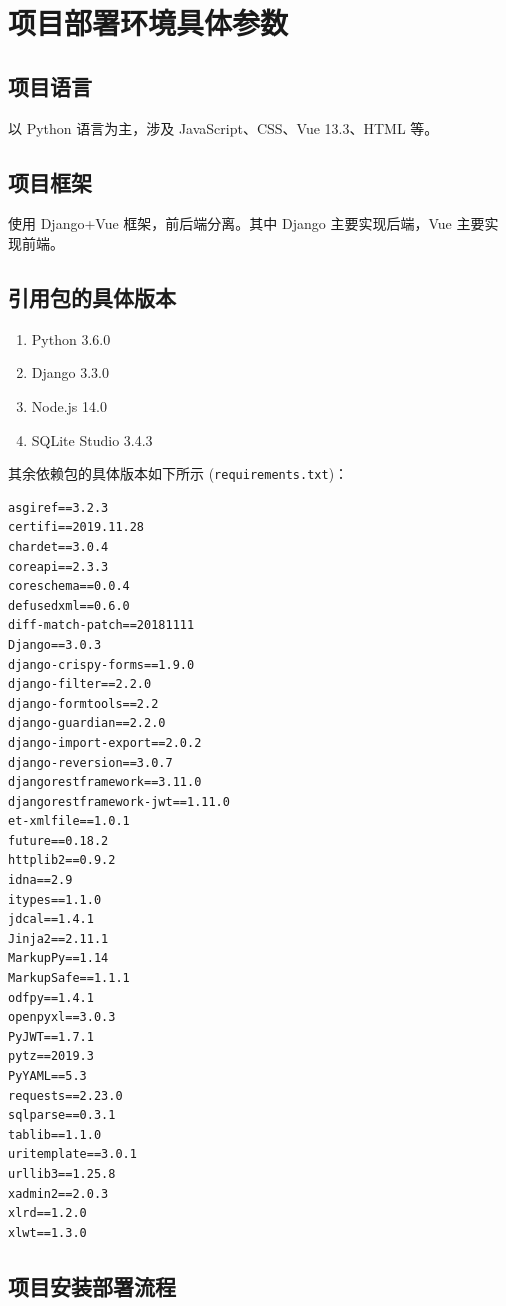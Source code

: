 \documentclass[UTF8,a4paper,10pt]{ctexart}
\begin{document}
\section{项目部署环境具体参数}

\subsection{项目语言}
以 Python 语言为主，涉及 JavaScript、CSS、Vue 13.3、HTML 等。

\subsection{项目框架}
使用 Django+Vue 框架，前后端分离。其中 Django 主要实现后端，Vue 主要实现前端。

\subsection{引用包的具体版本}
\begin{enumerate}
    \item Python 3.6.0
    \item Django 3.3.0
    \item Node.js 14.0
    \item SQLite Studio 3.4.3
\end{enumerate}

其余依赖包的具体版本如下所示 (\texttt{requirements.txt})：
\begin{framed}
\begin{verbatim}
asgiref==3.2.3
certifi==2019.11.28
chardet==3.0.4
coreapi==2.3.3
coreschema==0.0.4
defusedxml==0.6.0
diff-match-patch==20181111
Django==3.0.3
django-crispy-forms==1.9.0
django-filter==2.2.0
django-formtools==2.2
django-guardian==2.2.0
django-import-export==2.0.2
django-reversion==3.0.7
djangorestframework==3.11.0
djangorestframework-jwt==1.11.0
et-xmlfile==1.0.1
future==0.18.2
httplib2==0.9.2
idna==2.9
itypes==1.1.0
jdcal==1.4.1
Jinja2==2.11.1
MarkupPy==1.14
MarkupSafe==1.1.1
odfpy==1.4.1
openpyxl==3.0.3
PyJWT==1.7.1
pytz==2019.3
PyYAML==5.3
requests==2.23.0
sqlparse==0.3.1
tablib==1.1.0
uritemplate==3.0.1
urllib3==1.25.8
xadmin2==2.0.3
xlrd==1.2.0
xlwt==1.3.0
\end{verbatim}
\end{framed}

\subsection{项目安装部署流程}
\end{document}
